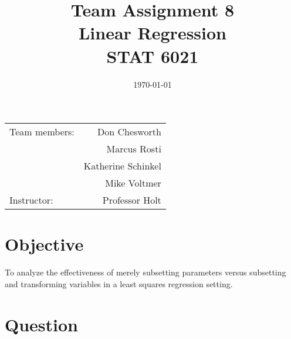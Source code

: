 \documentclass{article}
\title{Team Assignment 8 \\ Linear Regression \\ STAT 6021} %
\date{\today} %
\begin{document}
\maketitle %

\begin{center}
\begin{tabular}{l r}
Team members: & Don Chesworth \\ %
& Marcus Rosti \\
& Katherine Schinkel \\
& Mike Voltmer \\
Instructor: & Professor Holt %
\end{tabular}
\end{center}



\section{Objective}
To analyze the effectiveness of merely subsetting parameters versus subsetting and transforming variables in a least squares regression setting.


\section{Question}
\end{document}
